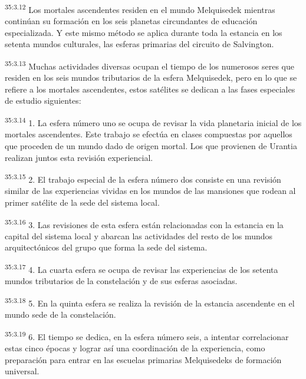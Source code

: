\par
\textsuperscript{35:3.12} Los mortales ascendentes residen en el mundo Melquisedek mientras continúan su formación en los seis planetas circundantes de educación especializada. Y este mismo método se aplica durante toda la estancia en los setenta mundos culturales, las esferas primarias del circuito de Salvington.

\par
\textsuperscript{35:3.13} Muchas actividades diversas ocupan el tiempo de los numerosos seres que residen en los seis mundos tributarios de la esfera Melquisedek, pero en lo que se refiere a los mortales ascendentes, estos satélites se dedican a las fases especiales de estudio siguientes:

\par
\textsuperscript{35:3.14} 1. La esfera número uno se ocupa de revisar la vida planetaria inicial de los mortales ascendentes. Este trabajo se efectúa en clases compuestas por aquellos que proceden de un mundo dado de origen mortal. Los que provienen de Urantia realizan juntos esta revisión experiencial.

\par
\textsuperscript{35:3.15} 2. El trabajo especial de la esfera número dos consiste en una revisión similar de las experiencias vividas en los mundos de las mansiones que rodean al primer satélite de la sede del sistema local.

\par
\textsuperscript{35:3.16} 3. Las revisiones de esta esfera están relacionadas con la estancia en la capital del sistema local y abarcan las actividades del resto de los mundos arquitectónicos del grupo que forma la sede del sistema.

\par
\textsuperscript{35:3.17} 4. La cuarta esfera se ocupa de revisar las experiencias de los setenta mundos tributarios de la constelación y de sus esferas asociadas.

\par
\textsuperscript{35:3.18} 5. En la quinta esfera se realiza la revisión de la estancia ascendente en el mundo sede de la constelación.

\par
\textsuperscript{35:3.19} 6. El tiempo se dedica, en la esfera número seis, a intentar correlacionar estas cinco épocas y lograr así una coordinación de la experiencia, como preparación para entrar en las escuelas primarias Melquisedeks de formación universal.

